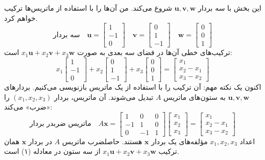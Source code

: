 \documentclass[12pt, a4paper]{book}
\begin{document}
	این بخش با سه بردار $\mathbf{u}, \mathbf{v}, \mathbf{w}$ شروع می‌کند. من آن‌ها را با استفاده از ماتریس‌ها ترکیب خواهم کرد.
	\[ \text{سه بردار} \quad \mathbf{u} = \begin{bmatrix} 1 \\ -1 \\ 0 \end{bmatrix} \quad \mathbf{v} = \begin{bmatrix} 0 \\ 1 \\ -1 \end{bmatrix} \quad \mathbf{w} = \begin{bmatrix} 0 \\ 0 \\ 1 \end{bmatrix} \]
	ترکیب‌های خطی آن‌ها در فضای سه بعدی به صورت $x_1\mathbf{u} + x_2\mathbf{v} + x_3\mathbf{w}$ است:
	\begin{equation}
		x_1 \begin{bmatrix} 1 \\ -1 \\ 0 \end{bmatrix} + x_2 \begin{bmatrix} 0 \\ 1 \\ -1 \end{bmatrix} + x_3 \begin{bmatrix} 0 \\ 0 \\ 1 \end{bmatrix} = \begin{bmatrix} x_1 \\ x_2 - x_1 \\ x_3 - x_2 \end{bmatrix}
	\end{equation}
	اکنون یک نکته مهم: آن ترکیب را با استفاده از یک ماتریس بازنویسی می‌کنیم. بردارهای $\mathbf{u}, \mathbf{v}, \mathbf{w}$ به ستون‌های ماتریس $A$ تبدیل می‌شوند. آن ماتریس، بردار $(x_1, x_2, x_3)$ را «ضرب» می‌کند:
	\begin{equation}
		\textbf{ماتریس ضربدر بردار} \quad A\mathbf{x} = \begin{bmatrix} 1 & 0 & 0 \\ -1 & 1 & 0 \\ 0 & -1 & 1 \end{bmatrix} \begin{bmatrix} x_1 \\ x_2 \\ x_3 \end{bmatrix} = \begin{bmatrix} x_1 \\ x_2 - x_1 \\ x_3 - x_2 \end{bmatrix}
	\end{equation}
	اعداد $x_1, x_2, x_3$ مؤلفه‌های یک بردار $\mathbf{x}$ هستند. حاصلضرب ماتریس $A$ در بردار $\mathbf{x}$ همان ترکیب $x_1\mathbf{u} + x_2\mathbf{v} + x_3\mathbf{w}$ از سه ستون در معادله (۱) است.
	
\end{document}
